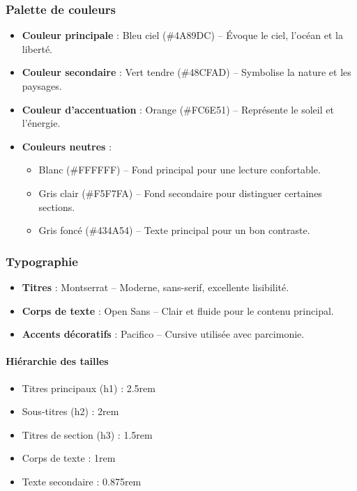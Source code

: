 \documentclass[a4paper,12pt]{article}
\begin{document}
\subsubsection{Palette de couleurs}
\begin{itemize}
  \item \textbf{Couleur principale} : Bleu ciel (\#4A89DC) – Évoque le ciel, l’océan et la liberté.
  \item \textbf{Couleur secondaire} : Vert tendre (\#48CFAD) – Symbolise la nature et les paysages.
  \item \textbf{Couleur d’accentuation} : Orange (\#FC6E51) – Représente le soleil et l’énergie.
  \item \textbf{Couleurs neutres} :
  \begin{itemize}
    \item Blanc (\#FFFFFF) – Fond principal pour une lecture confortable.
    \item Gris clair (\#F5F7FA) – Fond secondaire pour distinguer certaines sections.
    \item Gris foncé (\#434A54) – Texte principal pour un bon contraste.
  \end{itemize}
\end{itemize}

\subsubsection{Typographie}
\begin{itemize}
  \item \textbf{Titres} : Montserrat – Moderne, sans-serif, excellente lisibilité.
  \item \textbf{Corps de texte} : Open Sans – Clair et fluide pour le contenu principal.
  \item \textbf{Accents décoratifs} : Pacifico – Cursive utilisée avec parcimonie.
\end{itemize}

\paragraph{Hiérarchie des tailles}
\begin{itemize}
  \item Titres principaux (h1) : 2.5rem
  \item Sous-titres (h2) : 2rem
  \item Titres de section (h3) : 1.5rem
  \item Corps de texte : 1rem
  \item Texte secondaire : 0.875rem
\end{itemize}
\end{document}
